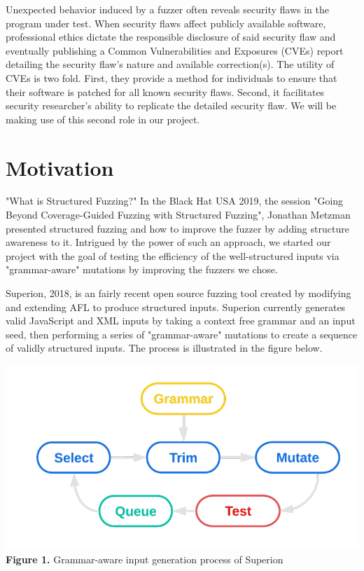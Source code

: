 \documentclass[12pt]{diazessay}
\begin{document}
Unexpected behavior induced by a fuzzer often reveals security flaws in the program under test.
When security flaws affect publicly available software, professional ethics dictate the responsible disclosure of said security flaw and eventually publishing a Common Vulnerabilities and Exposures (CVEs) \cite{mell2002use} report detailing the security flaw's nature and available correction(s).
The utility of CVEs is two fold.
First, they provide a method for individuals to ensure that their software is patched for all known security flaws.
Second, it facilitates security researcher's ability to replicate the detailed security flaw.
We will be making use of this second role in our project.


\section*{Motivation}
\label{Motivation}

"What is Structured Fuzzing?" In the Black Hat USA 2019\cite{blackhat2019}, the session "Going Beyond Coverage-Guided Fuzzing with Structured Fuzzing", Jonathan Metzman presented structured fuzzing and how to improve the fuzzer by adding structure awareness to it. 
Intrigued by the power of such an approach, we started our project with the goal of testing the efficiency of the well-structured inputs via "grammar-aware" mutations by improving the fuzzers we chose.

Superion\cite{superion}, 2018, is an fairly recent open source fuzzing tool created by modifying and extending AFL to produce structured inputs.
Superion currently generates valid JavaScript and XML inputs by taking a context free grammar and an input seed, then performing a series of "grammar-aware" mutations to create a sequence of validly structured inputs. The process is illustrated in the figure below.

\begin{center}
	\includegraphics[scale=0.4, trim={0 1cm 0 0}, clip]{superionfig.png}\\
	\textbf{Figure 1.} Grammar-aware input generation process of Superion
\end{center}
\vspace{3mm}
\end{document}

